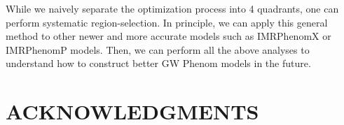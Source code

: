 \documentclass[twocolumn]{aastex631}
\begin{document}
While we naively separate the optimization process into 4 quadrants, one can
perform systematic region-selection. In principle, we can apply this general
method to other newer and more accurate models such as IMRPhenomX or IMRPhenomP
models. Then, we can perform all the above analyses to understand how to
construct better GW Phenom models in the future.  



\section{ACKNOWLEDGMENTS}



\end{document}
